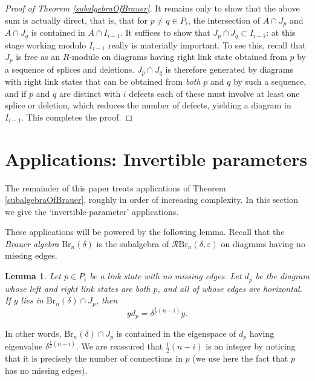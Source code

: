 \documentclass[12pt]{amsart}
\theoremstyle{plain}
\theoremstyle{definition} \newtheorem{definition}[theorem]{Definition}
\theoremstyle{plain}
\newtheorem{lemma}[theorem]{Lemma}
\theoremstyle{plain} \newtheorem{proposition}[theorem]{Proposition}
\theoremstyle{plain} \newtheorem{conjecture}[theorem]{Conjecture}
\theoremstyle{plain} \newtheorem{corollary}[theorem]{Corollary}
\theoremstyle{remark} \newtheorem{claim}[theorem]{Claim}
\theoremstyle{remark} \newtheorem{remark}[theorem]{Remark}
\theoremstyle{remark} \newtheorem{example}[theorem]{Example}
\theoremstyle{remark} \newtheorem{comment}[theorem]{Comment}
\theoremstyle{definition} \newtheorem{question}[theorem]{Question}
\newcommand{\RB}{\mathcal{R}\mathrm{Br}}
\newcommand{\Brauer}{\mathrm{Br}}
\newcommand{\mOne}{splice}
\newcommand{\mTwo}{deletion}
\begin{document}
\begin{proof}[Proof of Theorem \ref{subalgebraOfBrauer}]
It remains only to show that the above sum is actually direct, that is, that for $p \neq q \in P_i$, the intersection of $A \cap J_p$ and $A \cap J_q$ is contained in $A \cap I_{i-1}$. It suffices to show that $J_p \cap J_q \subset I_{i-1}$: at this stage working modulo $I_{i-1}$ really is materially important. To see this, recall that $J_p$ is free as an $R$-module on diagrams having right link state obtained from $p$ by a sequence of {\mOne}s and {\mTwo}s. $J_p \cap J_q$ is therefore generated by diagrams with right link states that can be obtained from \emph{both} $p$ and $q$ by such a sequence, and if $p$ and $q$ are distinct with $i$ defects each of these must involve at least one {\mOne} or {\mTwo}, which reduces the number of defects, yielding a diagram in $I_{i-1}$. This completes the proof. \end{proof}

\section{Applications: Invertible parameters} \label{applicationsInvertible}

The remainder of this paper treats applications of Theorem \ref{subalgebraOfBrauer}, roughly in order of increasing complexity. In this section we give the `invertible-parameter' applications.

These applications will be powered by the following lemma. Recall that the \emph{Brauer algebra} $\Brauer_n(\delta)$ is the subalgebra of $\RB_n(\delta,\varepsilon)$ on diagrams having no missing edges.

\begin{lemma} \label{mirrorDiagram} Let $p \in P_i$ be a link state with no missing edges. Let $d_p$ be the diagram whose left and right link states are both $p$, and all of whose edges are horizontal. If $y$ lies in $\Brauer_n(\delta) \cap J_p$, then $$y d_p = \delta^{\frac{1}{2}(n-i)} y.$$ \end{lemma}

In other words, $\Brauer_n(\delta) \cap J_p$ is contained in the eigenspace of $d_p$ having eigenvalue $\delta^{\frac{1}{2}(n-i)}$. We are reassured that $\frac{1}{2}(n-i)$ is an integer by noticing that it is precisely the number of connections in $p$ (we use here the fact that $p$ has no missing edges).
\end{document}
